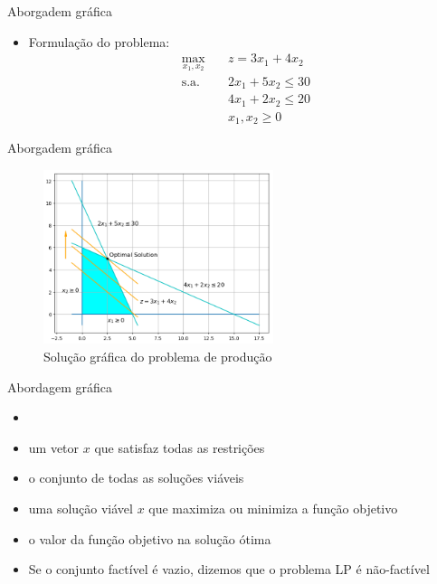 \documentclass[10pt]{beamer}
\begin{document}
\begin{frame}{Aborgadem gráfica}
    \begin{itemize}
        \item Formulação do problema:
        \begin{align*}
            \max_{x_1,x_2} \quad & z = 3x_1 + 4x_2\\
            \text{s.a.} \quad & 2x_1 + 5x_2 \leq 30\\
            & 4x_1 + 2x_2 \leq 20\\
            & x_1, x_2 \geq 0
        \end{align*}
    \end{itemize}
\end{frame}

\begin{frame}{Aborgadem gráfica}
    \begin{figure}
        \centering
        \includegraphics[width=0.6\textwidth]{./figures/aula15_fig1.png}
        \caption{Solução gráfica do problema de produção}        
    \end{figure}
\end{frame}

\begin{frame}{Abordagem gráfica}
    \begin{itemize}
        \item {}\bigskip
        \item {} um vetor $x$ que satisfaz todas as restrições\bigskip
        \item {} o conjunto de todas as soluções viáveis\bigskip
        \item {} uma solução viável $x$ que maximiza ou minimiza a função objetivo\bigskip
        \item {} o valor da função objetivo na solução ótima\bigskip
        \item Se o conjunto factível é vazio, dizemos que o problema LP é não-factível
    \end{itemize}    
\end{frame}
\end{document}
